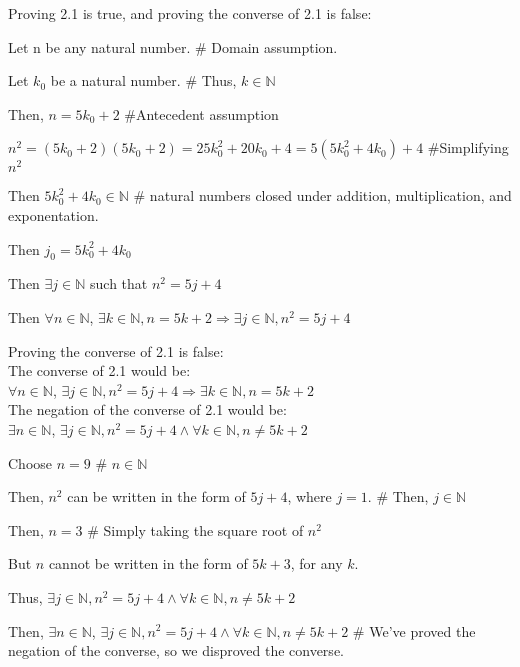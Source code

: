 \documentclass{article}
\begin{document}
\begin{enumerate}
\item Proving 2.1 is true, and proving the converse of 2.1 is false:%
				\item Then $\forall n \in \mathbb{N}$, $\exists k \in \mathbb{N}, n = 5k+2 \Rightarrow \exists j \in \mathbb{N}, n^2 = 5j+4$
		\end {description}
Proving the converse of 2.1 is false:\\
The converse of 2.1 would be:\\
$\forall n \in \mathbb{N}$, $\exists j \in \mathbb{N}, n^2 = 5j+4 \Rightarrow \exists k \in \mathbb{N}, n = 5k+2$\\
The negation of the converse of 2.1 would be: \\
$\exists n \in \mathbb{N}$, $\exists j \in \mathbb{N}, n^2 = 5j+4 \wedge \forall k \in \mathbb{N}, n \neq 5k+2$\\
		\begin {description}
				\item Choose $n = 9$ \# $n \in \mathbb{N}$
				\item Then, $n^2$ can be written in the form of $5j + 4$, where $j = 1$. \# Then, $j \in \mathbb{N}$
				\item Then, $n = 3$ \# Simply taking the square root of $n^2$
				\item But $n$ cannot be written in the form of $5k + 3$, for any $k$.
				\item Thus, $\exists j \in \mathbb{N}, n^2 = 5j+4 \wedge\forall k \in \mathbb{N}, n \neq 5k+2$
		
		\item Then, $\exists n \in \mathbb{N}$, $\exists j \in \mathbb{N}, n^2 = 5j+4 \wedge \forall k \in \mathbb{N}, n \neq 5k+2$ \# We've proved the negation of the converse, so we disproved the converse.
		\end{description}


\end{enumerate}
\end{document}
